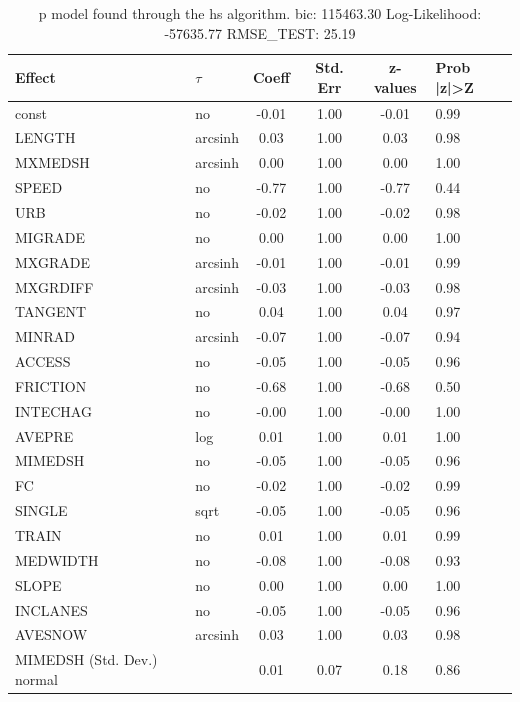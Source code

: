 \begin{table}
	\caption{p model found through the hs algorithm. bic: 115463.30 Log-Likelihood: -57635.77 RMSE_TEST: 25.19}
	\begin{center}
		\begin{tabular}{|l|l|c|c|c|l|}
			\hline
			Effect & $\tau$ & Coeff & Std. Err & z-values & Prob |z|>Z \\
			\hline
			const & no & -0.01 & 1.00 & -0.01 & 0.99 \\
			\hline
			LENGTH & arcsinh & 0.03 & 1.00 & 0.03 & 0.98 \\
			\hline
			MXMEDSH & arcsinh & 0.00 & 1.00 & 0.00 & 1.00 \\
			\hline
			SPEED & no & -0.77 & 1.00 & -0.77 & 0.44 \\
			\hline
			URB & no & -0.02 & 1.00 & -0.02 & 0.98 \\
			\hline
			MIGRADE & no & 0.00 & 1.00 & 0.00 & 1.00 \\
			\hline
			MXGRADE & arcsinh & -0.01 & 1.00 & -0.01 & 0.99 \\
			\hline
			MXGRDIFF & arcsinh & -0.03 & 1.00 & -0.03 & 0.98 \\
			\hline
			TANGENT & no & 0.04 & 1.00 & 0.04 & 0.97 \\
			\hline
			MINRAD & arcsinh & -0.07 & 1.00 & -0.07 & 0.94 \\
			\hline
			ACCESS & no & -0.05 & 1.00 & -0.05 & 0.96 \\
			\hline
			FRICTION & no & -0.68 & 1.00 & -0.68 & 0.50 \\
			\hline
			INTECHAG & no & -0.00 & 1.00 & -0.00 & 1.00 \\
			\hline
			AVEPRE & log & 0.01 & 1.00 & 0.01 & 1.00 \\
			\hline
			MIMEDSH & no & -0.05 & 1.00 & -0.05 & 0.96 \\
			\hline
			FC & no & -0.02 & 1.00 & -0.02 & 0.99 \\
			\hline
			SINGLE & sqrt & -0.05 & 1.00 & -0.05 & 0.96 \\
			\hline
			TRAIN & no & 0.01 & 1.00 & 0.01 & 0.99 \\
			\hline
			MEDWIDTH & no & -0.08 & 1.00 & -0.08 & 0.93 \\
			\hline
			SLOPE & no & 0.00 & 1.00 & 0.00 & 1.00 \\
			\hline
			INCLANES & no & -0.05 & 1.00 & -0.05 & 0.96 \\
			\hline
			AVESNOW & arcsinh & 0.03 & 1.00 & 0.03 & 0.98 \\
			\hline
			MIMEDSH (Std. Dev.) normal &  & 0.01 & 0.07 & 0.18 & 0.86 \\

\end{tabular}
\end{center}
\end{table}
